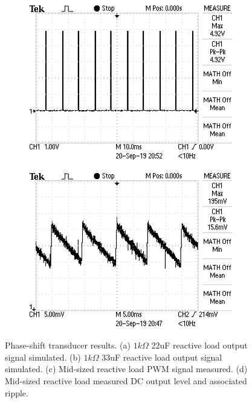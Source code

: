 \begin{figure}[!ht]
\begin{subfigure}[]{0.4\textwidth}
  		\includegraphics[width=1\linewidth]{./Figures/ptrans_meas_nom.JPG}
		    \caption{} \label{subfig:ptrans_meas_nom}
     \end{subfigure}
          \begin{subfigure}[]{0.4\textwidth}
             \centering
  		\includegraphics[width=1.0\linewidth]{./Figures/ptrans_meas_noise.JPG}
		   \caption{ } \label{subfig:ptrans_meas_noise}
     \end{subfigure}
     \caption[Phase shift transducer measurement results] {Phase-shift transducer results. (a) $1k\Omega$ 22uF reactive load output signal simulated. (b) $1k\Omega$ 33uF reactive load output signal simulated. (c) Mid-sized reactive load PWM signal measured. (d) Mid-sized reactive load measured DC output level and associated ripple. } \label{fig:ptrans_results}
\end{figure}

